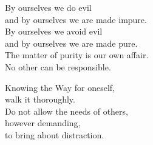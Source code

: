 By ourselves we do evil\\
and by ourselves we are made impure.\\
By ourselves we avoid evil\\
and by ourselves we are made pure.\\
The matter of purity is our own affair.\\
No other can be responsible.


Knowing the Way for oneself,\\
walk it thoroughly.\\
Do not allow the needs of others,\\
however demanding,\\
to bring about distraction.

